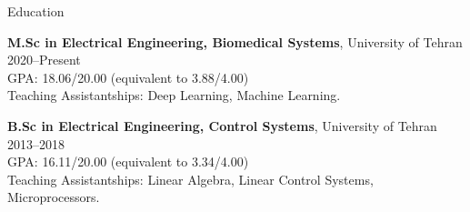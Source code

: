 \documentclass{resume} %
\begin{document}
	
	\begin{rSection}{Education}
		
		{\bf M.Sc in Electrical Engineering, Biomedical Systems}, University of Tehran \hfill {2020--Present}\\
		GPA: 18.06/20.00 (equivalent to 3.88/4.00)\\
		Teaching Assistantships: Deep Learning, Machine Learning.
		
		{\bf B.Sc in Electrical Engineering, Control Systems}, University of Tehran \hfill {2013--2018}\\
		GPA: 16.11/20.00 (equivalent to 3.34/4.00)\\
		Teaching Assistantships: Linear Algebra, Linear Control Systems, Microprocessors.
		
			
		
	\end{rSection}
	
\end{document}
